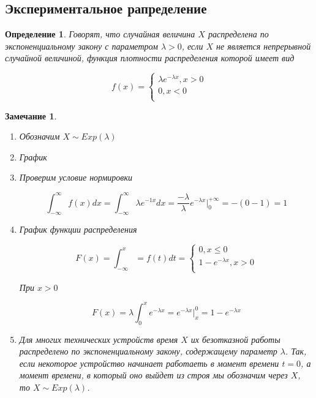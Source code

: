 \documentclass[a4paper, 14pt]{report}
\newtheorem{defenition}{Определение}[section]
\newtheorem{note}{Замечание}[section]
\begin{document}
\subsection{Экспериментальное рапределение}

\begin{defenition}
    Говорят, что случайная величина $X$ распределена по экспоненциальному закону с параметром $\lambda > 0$, если $X$ не является непрерывной случайной величиной, функция плотности распределения которой имеет вид

    $$
    f(x) =
    \begin{cases}
        \lambda e^{-\lambda x}, x > 0 \\
        0, x < 0 \\
    \end{cases}
    $$
\end{defenition}

\begin{note}
    \begin{enumerate}
        \item Обозначим $X \sim Exp(\lambda)$
        \item График
        \item Проверим условие нормировки

            $$
            \int_{-\infty}^{\infty} f(x) dx = \int_{-\infty}^\infty \lambda e^{-1x} dx = \frac{-\lambda}{\lambda} e^{-\lambda x} |_{0}^{+\infty} = -(0-1) = 1
            $$

        \item График функции распределения

            $$
            F(x) = \int_{-\infty}^x = f(t)dt =
            \begin{cases}
                0, x \le 0 \\
                1 - e^{-\lambda x}, x > 0 \\
            \end{cases}
            $$

            При $x > 0$

            $$
            F(x) = \lambda \int_0^x e^{-\lambda x} = e^{-\lambda x}|_x^0 = 1 - e^{-\lambda x}
            $$

        \item Для многих технических устройств время $X$ их безотказной работы распределено по экспоненциальному закону, содержащему параметр $\lambda$. Так, если некоторое устройство начинает работаеть в момент времени $t=0$, а момент времени, в который оно выйдет из строя мы обозначим через $X$, то $X \sim Exp(\lambda)$.
    \end{enumerate}
\end{note}
\end{document}
